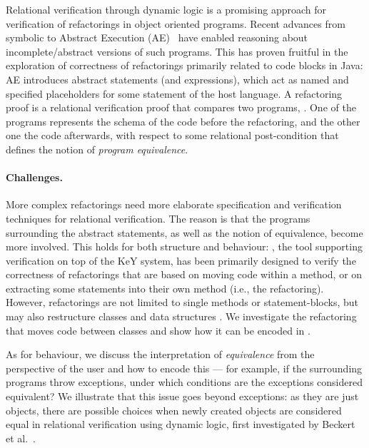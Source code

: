 
Relational verification through dynamic logic is a promising approach for verification of refactorings in object oriented programs.
Recent advances from symbolic to Abstract Execution (AE)~\cite{DBLP:conf/fm/SteinhofelH19} have enabled reasoning about incomplete/abstract versions of such programs.
This has proven fruitful in the exploration of correctness of refactorings primarily related to code blocks in Java:
%
AE introduces abstract statements (and expressions), which act as named and specified placeholders for some statement of the host language.
A refactoring proof is a relational verification proof that compares two programs, .
One of the programs represents the schema of the code before the refactoring, and the other one the code afterwards, with respect to some relational post-condition that defines the notion of \emph{program equivalence}.


\paragraph{Challenges.}
More complex refactorings need more elaborate specification and verification techniques for relational verification. 
The reason is that the programs surrounding the abstract statements, as well as the notion of equivalence, become more involved.
This holds for both structure and behaviour:
\Refinity{} \cite{steinhoefel:ae}, the tool supporting verification on top of the KeY system,
has been primarily designed to verify the correctness of refactorings that are based on moving code within a method, or on extracting some statements into their own method (i.e., the  refactoring).
However, refactorings are not limited to single methods or statement-blocks, but may also restructure classes and data structures \cite{fowler:refactoring}.
We investigate the  refactoring that moves code between classes and show how it can be encoded in \Refinity{}.


As for behaviour, we discuss the interpretation of \textit{equivalence} from the perspective of the user and how to encode this --- for example, if the surrounding programs throw exceptions, under which conditions are the exceptions considered equivalent?
We illustrate that this issue goes beyond exceptions:
as they are just objects, there are possible choices when newly created objects are considered equal in relational verification using dynamic logic, 
first investigated by Beckert et al.~\cite{DBLP:conf/lopstr/BeckertBKSSU13}.



